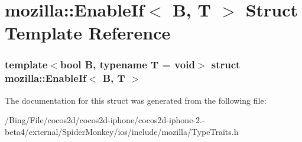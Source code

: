 \hypertarget{structmozilla_1_1_enable_if}{\section{mozilla\-:\-:Enable\-If$<$ B, T $>$ Struct Template Reference}
\label{structmozilla_1_1_enable_if}
}
\subsubsection*{template$<$bool B, typename T = void$>$ struct mozilla\-::\-Enable\-If$<$ B, T $>$}



The documentation for this struct was generated from the following file\-:\begin{DoxyCompactItemize}
\item 
/\-Bing/\-File/cocos2d/cocos2d-\/iphone/cocos2d-\/iphone-\/2.-\/beta4/external/\-Spider\-Monkey/ios/include/mozilla/Type\-Traits.\-h\end{DoxyCompactItemize}
